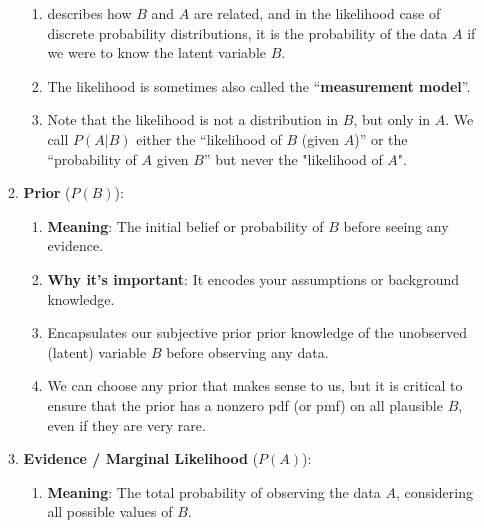 \begin{enumerate}
\begin{enumerate}
\begin{enumerate}
            \item describes how $B$ and $A$ are related, and in the likelihood case of discrete probability distributions, it is the probability of the data $A$ if we were to know the latent variable $B$.
            \hfill\cite{mfml/book/mml/Deisenroth-Faisal-Ong}

            \item The likelihood is sometimes also called the “\textbf{measurement model}”.
            \hfill\cite{mfml/book/mml/Deisenroth-Faisal-Ong}

            \item Note that the likelihood is not a distribution in $B$, but only in $A$. 
            We call $P(A | B)$ either the “likelihood of $B$ (given $A$)” or the “probability of $A$ given $B$” but never the "likelihood of $A$".
            \hfill\cite{mfml/book/mml/Deisenroth-Faisal-Ong}
        \end{enumerate}

        \item \textbf{Prior} ($P(B)$): 
        \begin{enumerate}
            \item \textbf{Meaning}: The initial belief or probability of $B$ before seeing any evidence.
            \hfill \cite{common/online/chatgpt}

            \item \textbf{Why it's important}: It encodes your assumptions or background knowledge.
            \hfill \cite{common/online/chatgpt}

            \item Encapsulates our subjective prior prior knowledge of the unobserved (latent) variable $B$ before observing any data. 
            \hfill\cite{mfml/book/mml/Deisenroth-Faisal-Ong}

            \item We can choose any prior that makes sense to us, but it is critical to ensure that the prior has a nonzero pdf (or pmf) on all plausible $B$, even if they are very rare.
            \hfill\cite{mfml/book/mml/Deisenroth-Faisal-Ong}
        \end{enumerate}
        
        \item \textbf{Evidence / Marginal Likelihood} ($P(A)$):
        \begin{enumerate}
            \item \textbf{Meaning}: The total probability of observing the data $A$, considering all possible values of $B$.
            \hfill \cite{common/online/chatgpt}


\end{enumerate}
\end{enumerate}
\end{enumerate}
